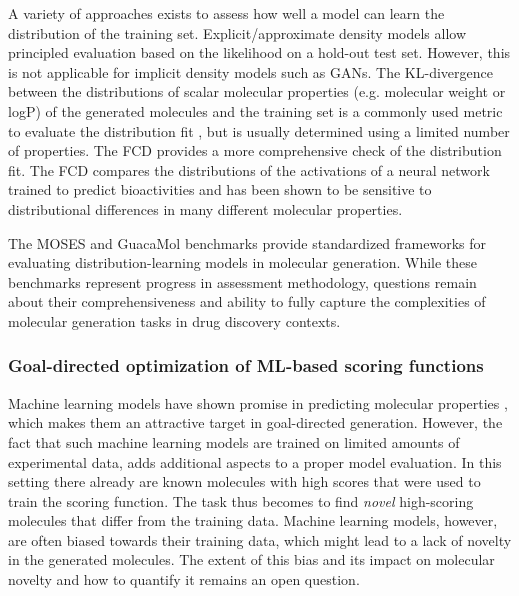 A variety of approaches exists to assess how well a model can learn the distribution of the training
set. Explicit/approximate density models allow principled evaluation based on the likelihood on a
hold-out test set. However, this is not applicable for implicit density models such as \acp{GAN}.
The KL-divergence between the distributions of scalar molecular properties (e.g. molecular weight or
logP) of the generated molecules and the training set is a commonly used metric to evaluate the
distribution fit \citep{brownGuacaMolBenchmarkingModels2019}, but is usually determined using a
limited number of properties. The \ac{FCD} \citep{preuerFrechetChemNetDistance2018} provides a more
comprehensive check of the distribution fit. The \ac{FCD} compares the distributions of the activations
of a neural network trained to predict bioactivities and has been shown to be sensitive to
distributional differences in many different molecular properties.

The MOSES \citep{polykovskiyMolecularSetsMOSES2020} and GuacaMol
\citep{brownGuacaMolBenchmarkingModels2019} benchmarks provide standardized frameworks for
evaluating distribution-learning models in molecular generation. While these benchmarks represent
progress in assessment methodology, questions remain about their comprehensiveness and ability to
fully capture the complexities of molecular generation tasks in drug discovery contexts.

\subsubsection{Goal-directed optimization of ML-based scoring functions}
Machine learning models have shown promise in predicting molecular properties
\citep{mayrDeepToxToxicityPrediction2016,klambauerMachineLearningDrug2019,vamathevanApplicationsMachineLearning2019,chenRiseDeepLearning2018,stokesDeepLearningApproach2020},
which makes them an attractive target in goal-directed generation. However, the fact that such
machine learning models are trained on limited amounts of experimental data, adds additional aspects
to a proper model evaluation. In this setting there already are known molecules with high scores
that were used to train the scoring function. The task thus becomes to find \emph{novel}
high-scoring molecules that differ from the training data. Machine learning models, however, are
often biased towards their training data, which might lead to a lack of novelty in the generated
molecules. The extent of this bias and its impact on molecular novelty and how to quantify it
remains an open question.


